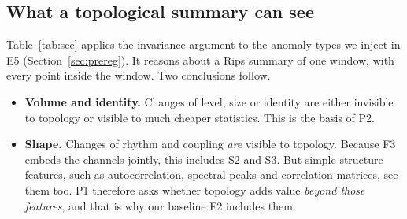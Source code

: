 \subsection{What a topological summary can see}
\label{sec:cansee}
Table~\ref{tab:see} applies the invariance argument to the anomaly types we inject in E5 (Section~\ref{sec:prereg}). It reasons about a Rips summary of one window, with every point inside the window. Two conclusions follow.
\begin{itemize}
  \item \textbf{Volume and identity.} Changes of level, size or identity are either invisible to topology or visible to much cheaper statistics. This is the basis of P2.
  \item \textbf{Shape.} Changes of rhythm and coupling \emph{are} visible to topology. Because F3 embeds the channels jointly, this includes S2 and S3. But simple structure features, such as autocorrelation, spectral peaks and correlation matrices, see them too. P1 therefore asks whether topology adds value \emph{beyond those features}, and that is why our baseline F2 includes them.
\end{itemize}

